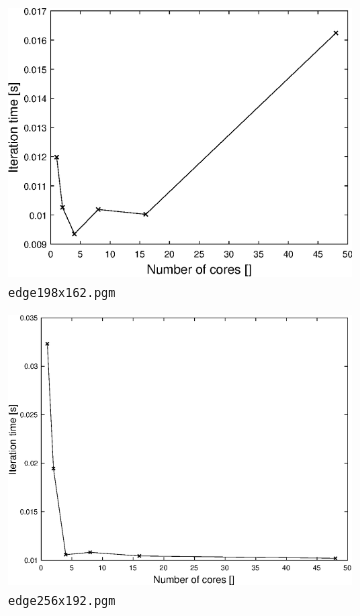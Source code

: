 \documentclass{article} %
\begin{document}
\begin{figure}
\begin{subfigure}[b]{.4\textwidth}
    \centering
    \includegraphics[width=\textwidth]{figures/cores_itertime_198.eps}
    \caption{\texttt{edge198x162.pgm}}
    \label{fig:coretime198}
\end{subfigure}
\hfill
\begin{subfigure}[b]{.4\textwidth}
    \centering
    \includegraphics[width=\textwidth]{figures/cores_itertime_256.eps}
    \caption{\texttt{edge256x192.pgm}}
    \label{fig:coretime256}
\end{subfigure}
\begin{subfigure}[b]{.4\textwidth}

\end{subfigure}
\end{figure}
\end{document}

